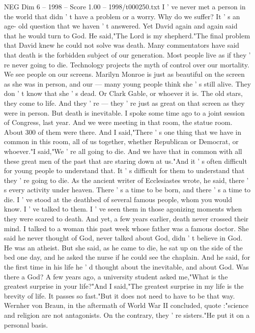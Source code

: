 \begin{textsample}{NEG Dim 6 – 1998 – Score 1.00 – 1998/t000250.txt}
I ' ve never met a person in the world that didn ' t have a problem or a worry.
Why do we suffer?
It ' s an age- old question that we haven ' t answered.
Yet David again and again said that he would turn to God.
He said,"The Lord is my shepherd."The final problem that David knew he could not solve was death.
Many commentators have said that death is the forbidden subject of our generation.
Most people live as if they ' re never going to die.
Technology projects the myth of control over our mortality.
We see people on our screens.
Marilyn Monroe is just as beautiful on the screen as she was in person, and our — many young people think she ' s still alive.
They don ' t know that she ' s dead.
Or Clark Gable, or whoever it is.
The old stars, they come to life.
And they ' re — they ' re just as great on that screen as they were in person.
But death is inevitable.
I spoke some time ago to a joint session of Congress, last year.
And we were meeting in that room, the statue room.
About 300 of them were there.
And I said,"There ' s one thing that we have in common in this room, all of us together, whether Republican or Democrat, or whoever."I said,"We ' re all going to die.
And we have that in common with all these great men of the past that are staring down at us."And it ' s often difficult for young people to understand that.
It ' s difficult for them to understand that they ' re going to die.
As the ancient writer of Ecclesiastes wrote, he said, there ' s every activity under heaven.
There ' s a time to be born, and there ' s a time to die.
I ' ve stood at the deathbed of several famous people, whom you would know.
I ' ve talked to them.
I ' ve seen them in those agonizing moments when they were scared to death.
And yet, a few years earlier, death never crossed their mind.
I talked to a woman this past week whose father was a famous doctor.
She said he never thought of God, never talked about God, didn ' t believe in God.
He was an atheist.
But she said, as he came to die, he sat up on the side of the bed one day, and he asked the nurse if he could see the chaplain.
And he said, for the first time in his life he ' d thought about the inevitable, and about God.
Was there a God?
A few years ago, a university student asked me,"What is the greatest surprise in your life?"And I said,"The greatest surprise in my life is the brevity of life.
It passes so fast."But it does not need to have to be that way.
Wernher von Braun, in the aftermath of World War II concluded, quote :"science and religion are not antagonists.
On the contrary, they ' re sisters."He put it on a personal basis.

\end{textsample}
